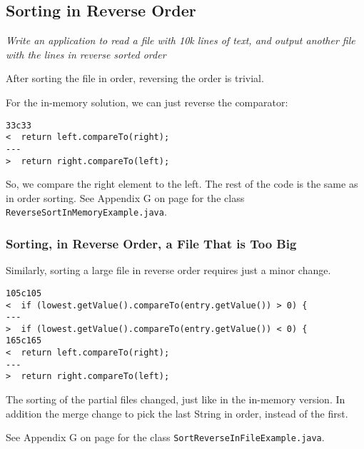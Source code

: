 \subsection{Sorting in Reverse Order}
\textit{Write an application to read a file with 10k lines of text, and output another file with the lines in reverse sorted order}

After sorting the file in order, reversing the order is trivial.

For the in-memory solution, we can just reverse the comparator:

\begin{lstlisting}
33c33
<  return left.compareTo(right);
---
>  return right.compareTo(left);

\end{lstlisting}
So, we compare the right element to the left. The rest of the code is the same as in order sorting. See Appendix G on page \pageref{App:AppendixG} for the class \texttt{ReverseSortInMemoryExample.java}.

\subsubsection{Sorting, in Reverse Order, a File That is Too Big}
Similarly, sorting a large file in reverse order requires just a minor change.

\begin{lstlisting}
105c105
<  if (lowest.getValue().compareTo(entry.getValue()) > 0) {
---
>  if (lowest.getValue().compareTo(entry.getValue()) < 0) {
165c165
<  return left.compareTo(right);
---
>  return right.compareTo(left);

\end{lstlisting}

The sorting of the partial files changed, just like in the in-memory version. In addition the merge change to pick the last String in order, instead of the first.

See Appendix G on page \pageref{App:AppendixG} for the class \texttt{SortReverseInFileExample.java}.